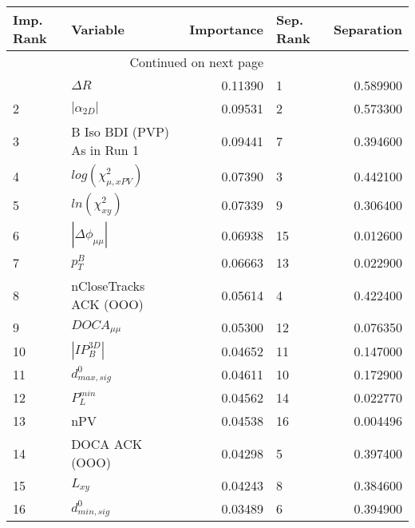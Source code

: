 \usepackage{lscape}

\begin{landscape}
\begin{longtable}{llrlr}
\toprule
Imp. Rank &                     Variable &  Importance & Sep. Rank &  Separation \\
\midrule
\endhead
\midrule
\multicolumn{3}{r}{{Continued on next page}} \\
\midrule
\endfoot

\bottomrule
\endlastfoot
        1 &                   $\Delta R$ &     0.11390 &         1 &    0.589900 \\
        2 &              $|\alpha_{2D}|$ &     0.09531 &         2 &    0.573300 \\
        3 &  B Iso BDI (PVP) As in Run 1 &     0.09441 &         7 &    0.394600 \\
        4 &    $log(\chi^{2}_{\mu,xPV})$ &     0.07390 &         3 &    0.442100 \\
        5 &          $ln(\chi^{2}_{xy})$ &     0.07339 &         9 &    0.306400 \\
        6 &     $|\Delta \phi_{\mu\mu}|$ &     0.06938 &        15 &    0.012600 \\
        7 &                    $p^B_{T}$ &     0.06663 &        13 &    0.022900 \\
        8 &       nCloseTracks ACK (OOO) &     0.05614 &         4 &    0.422400 \\
        9 &              $DOCA_{\mu\mu}$ &     0.05300 &        12 &    0.076350 \\
       10 &              $|IP_{B}^{3D}|$ &     0.04652 &        11 &    0.147000 \\
       11 &             $d^0_{max, sig}$ &     0.04611 &        10 &    0.172900 \\
       12 &                $P^{min}_{L}$ &     0.04562 &        14 &    0.022770 \\
       13 &                          nPV &     0.04538 &        16 &    0.004496 \\
       14 &               DOCA ACK (OOO) &     0.04298 &         5 &    0.397400 \\
       15 &                     $L_{xy}$ &     0.04243 &         8 &    0.384600 \\
       16 &             $d^0_{min, sig}$ &     0.03489 &         6 &    0.394900 \\
\end{longtable}

\end{landscape}
